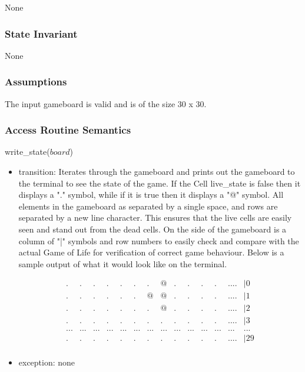 \documentclass[12pt]{article}
\begin{document}
None

\subsubsection* {State Invariant}

None

\subsubsection* {Assumptions}

The input gameboard is valid and is of the size 30 x 30.

\subsubsection* {Access Routine Semantics}

\noindent write\_state($board$)
\begin{itemize}
\item transition: Iterates through the gameboard and prints out the gameboard to the terminal to see the state of the game. If the Cell live\_state is false then it displays a "." symbol, while if it is true then it displays a "@" symbol. All elements in the gameboard as separated by a single space, and rows are separated by a new line character. This ensures that the live cells are easily seen and stand out from the dead cells. On the side of the gameboard is a column of "|" symbols and row numbers to easily check and compare with the actual Game of Life for verification of correct game behaviour. Below is a sample output of what it would look like on the terminal.

  \begin{equation}
    \begin{array}{cccccccccccccc}
      . & . & . & . & . & . & . & @ & . & . & . & . & . ... & |0 \\ 
     . & . & . & . & . & . & @ & @ & . & . & . & . & . ... & |1 \\ 
      . & . & . & . & . & . & . & @ & . & . & . & . & . ... & |2 \\ 
      . & . & . & . & . & . & . & . & . & . & . & . & . ... & |3 \\ 
      ... & ... & ... & ... & ... & ... & ... & ... & ... & ... & ... & ... & ... & ... \\
      . & . & . & . & . & . & . & . & . & . & . & . & . ... & |29 \\ 
    \end{array}
  \end{equation}

\item exception: none
\end{itemize}
\end{document}
